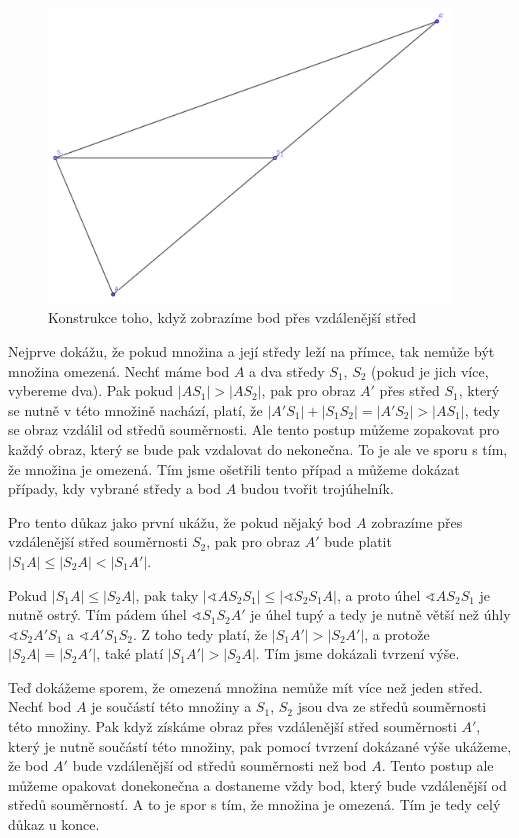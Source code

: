 \documentclass{fkssolpub}
\author{Ondřej Sedláček}
\renewcommand{\angle}{\sphericalangle}
\begin{document}
\begin{figure}
	\begin{center}
		\includegraphics[width=0.95\textwidth]{C-fig}
	\end{center}
	\caption{Konstrukce toho, když zobrazíme bod přes vzdálenější střed}
	\label{fig:1}
\end{figure}

Nejprve dokážu, že pokud množina a její středy leží na přímce, tak nemůže být množina omezená. Nechť máme bod $A$ a dva středy $S_1$, $S_2$ (pokud je jich více, vybereme dva). Pak pokud $|AS_1| > |AS_2|$, pak pro obraz $A'$ přes střed $S_1$, který se nutně v této množině nachází, platí, že $|A' S_1| + |S_1 S_2| = |A'S_2| > |AS_1|$, tedy se obraz vzdálil od středů souměrnosti. Ale tento postup můžeme zopakovat pro každý obraz, který se bude pak vzdalovat do nekonečna. To je ale ve sporu s tím, že množina je omezená. Tím jsme ošetřili tento případ a můžeme dokázat případy, kdy vybrané středy a bod $A$ budou tvořit trojúhelník.

Pro tento důkaz jako první ukážu, že pokud nějaký bod $A$ zobrazíme přes vzdálenější střed souměrnosti $S_2$, pak pro obraz $A'$ bude platit $|S_1A| \leq |S_2 A| < |S_1A'|$.

Pokud $|S_1A| \leq |S_2 A|$, pak taky $|\angle AS_2 S_1| \leq |\angle S_2 S_1 A|$, a proto úhel $\angle AS_2 S_1$ je nutně ostrý. Tím pádem úhel $\angle S_1 S_2 A'$ je úhel tupý a tedy je nutně větší než úhly $\angle S_2 A' S_1$ a $\angle A'S_1 S_2$. Z toho tedy platí, že $|S_1 A'| > |S_2 A'|$, a protože $|S_2 A| = |S_2 A'|$, také platí $|S_1 A'| > |S_2 A|$. Tím jsme dokázali tvrzení výše.

Teď dokážeme sporem, že omezená množina nemůže mít více než jeden střed. Nechť bod $A$ je součástí této množiny a $S_1$, $S_2$ jsou dva ze středů souměrnosti této množiny. Pak když získáme obraz přes vzdálenější střed souměrnosti $A'$, který je nutně součástí této množiny, pak pomocí tvrzení dokázané výše ukážeme, že bod $A'$ bude vzdálenější od středů souměrnosti než bod $A$. Tento postup ale můžeme opakovat donekonečna a dostaneme vždy bod, který bude vzdálenější od středů souměrností. A to je spor s tím, že množina je omezená. Tím je tedy celý důkaz u konce.
\end{document}
